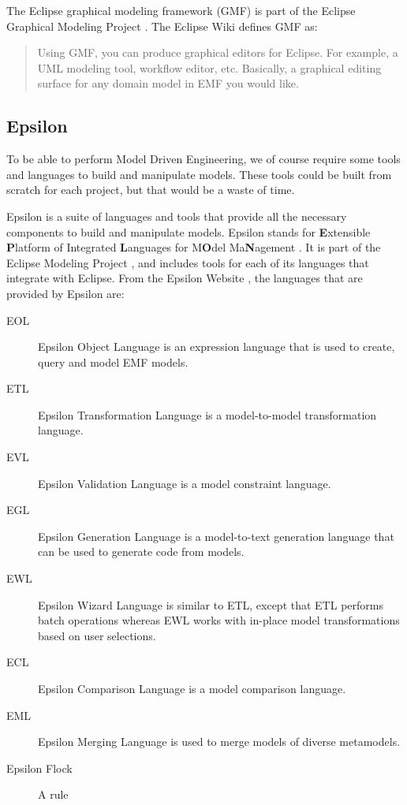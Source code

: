The Eclipse graphical modeling framework (GMF) is part of the Eclipse Graphical Modeling Project \citep{gmpSite}. The Eclipse Wiki \cite{gmpFAQ} defines GMF as:

\begin{quote} Using GMF, you can produce graphical editors for Eclipse. For example, a UML modeling tool, workflow editor, etc. Basically, a graphical editing surface for any domain model in EMF you would like. \end{quote}



\subsection{Epsilon}
To be able to perform Model Driven Engineering, we of course require some tools and languages to build and manipulate models. These tools could be built from scratch for each project, but that would be a waste of time.

Epsilon is a suite of languages and tools that provide all the necessary components to build and manipulate models. Epsilon stands for \textbf{E}xtensible \textbf{P}latform of Integrated \textbf{L}anguages for M\textbf{O}del Ma\textbf{N}agement \citep{epsilonWebsite}. It is part of the Eclipse Modeling Project \citep{ecliplseModelingProjectSite}, and includes tools for each of its languages that integrate with Eclipse. From the Epsilon Website \citep{epsilonWebsite}, the languages that are provided by Epsilon are:

\begin{description}
\item[EOL] Epsilon Object Language is an expression language that is used to create, query and model EMF models.
\item[ETL] Epsilon Transformation Language is a model-to-model transformation language.
\item[EVL] Epsilon Validation Language is a model constraint language.
\item[EGL] Epsilon Generation Language is a model-to-text generation language that can be used to generate code from models.
\item[EWL] Epsilon Wizard Language is similar to ETL, except that ETL performs batch operations whereas EWL works with in-place model transformations based on user selections.
\item[ECL] Epsilon Comparison Language is a model comparison language.
\item[EML] Epsilon Merging Language is used to merge models of diverse metamodels.
\item[Epsilon Flock] A rule
\end{description}

